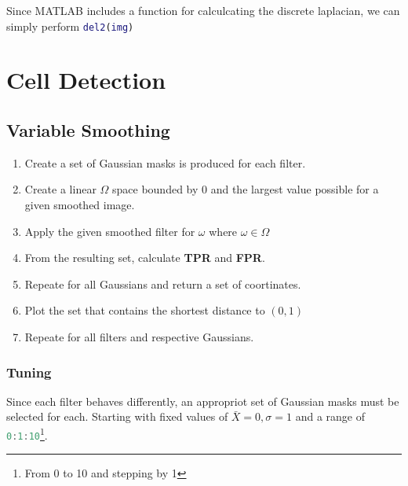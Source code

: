 \documentclass{Resources/UoBLab1}
\begin{document}
Since MATLAB includes a function for calculcating the discrete laplacian, we can simply perform
\lstinline[language=MATLAB]{del2(img)}\cite{del2}


\section{Cell Detection}
\subsection*{Variable Smoothing}
\begin{enumerate}
	\item Create a set of Gaussian masks is produced for each filter.
	\item Create a linear $\Omega$ space bounded by 0 and the largest value possible for a given smoothed image.
	\item Apply the given smoothed filter for $\omega$ where $\omega \in \Omega$
	\item From the resulting set, calculate \textbf{TPR} and \textbf{FPR}.
	\item Repeate for all Gaussians and return a set of coortinates.
	\item Plot the set that contains the shortest distance to \((0,1)\)
	\item Repeate for all filters and respective Gaussians.
\end{enumerate}
\subsubsection*{Tuning}
Since each filter behaves differently, an appropriot set of Gaussian masks must be selected for each.
Starting with fixed values of \begin{math}
\bar{X} = 0 ,  \sigma{} = 1
\end{math}
and a range of
\lstinline[language=MATLAB]{0:1:10}\footnote[1]{From 0 to 10 and stepping by 1}.
\end{document}
